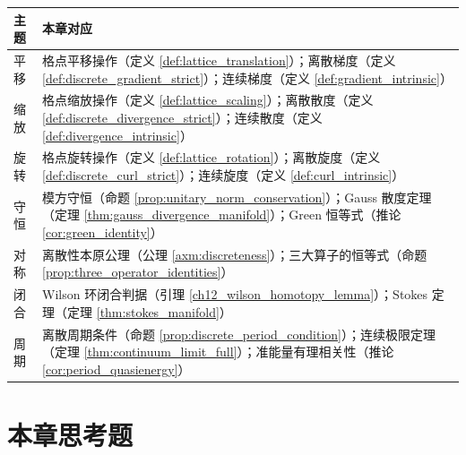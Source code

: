 \begin{center}
\renewcommand{\arraystretch}{1.3}
\begin{tabular}{>{\centering\arraybackslash}p{2.2cm}>{\centering\arraybackslash}p{10.5cm}}
\toprule
主题 & 本章对应 \\
\midrule
平移 & 格点平移操作（定义 \ref{def:lattice_translation}）；离散梯度（定义 \ref{def:discrete_gradient_strict}）；连续梯度（定义 \ref{def:gradient_intrinsic}） \\
缩放 & 格点缩放操作（定义 \ref{def:lattice_scaling}）；离散散度（定义 \ref{def:discrete_divergence_strict}）；连续散度（定义 \ref{def:divergence_intrinsic}） \\
旋转 & 格点旋转操作（定义 \ref{def:lattice_rotation}）；离散旋度（定义 \ref{def:discrete_curl_strict}）；连续旋度（定义 \ref{def:curl_intrinsic}） \\
守恒 & 模方守恒（命题 \ref{prop:unitary_norm_conservation}）；Gauss 散度定理（定理 \ref{thm:gauss_divergence_manifold}）；Green 恒等式（推论 \ref{cor:green_identity}） \\
对称 & 离散性本原公理（公理 \ref{axm:discreteness}）；三大算子的恒等式（命题 \ref{prop:three_operator_identities}） \\
闭合 & Wilson 环闭合判据（引理 \ref{ch12_wilson_homotopy_lemma}）；Stokes 定理（定理 \ref{thm:stokes_manifold}） \\
周期 & 离散周期条件（命题 \ref{prop:discrete_period_condition}）；连续极限定理（定理 \ref{thm:continuum_limit_full}）；准能量有理相关性（推论 \ref{cor:period_quasienergy}） \\
\bottomrule
\end{tabular}
\end{center}

\section*{本章思考题}

